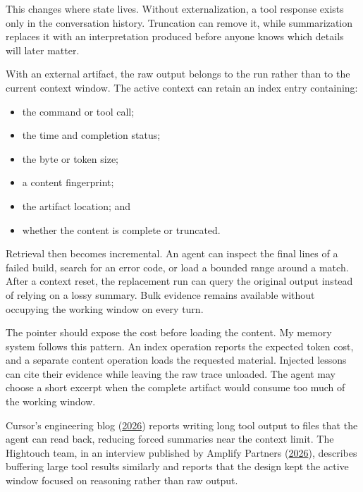 This changes where state lives. Without externalization, a tool response exists only in the conversation history. Truncation can remove it, while summarization replaces it with an interpretation produced before anyone knows which details will later matter.


With an external artifact, the raw output belongs to the run rather than to the current context window. The active context can retain an index entry containing:

\begin{itemize}
\tightlist
\item
  the command or tool call;
\item
  the time and completion status;
\item
  the byte or token size;
\item
  a content fingerprint;
\item
  the artifact location; and
\item
  whether the content is complete or truncated.
\end{itemize}

Retrieval then becomes incremental. An agent can inspect the final lines of a failed build, search for an error code, or load a bounded range around a match. After a context reset, the replacement run can query the original output instead of relying on a lossy summary. Bulk evidence remains available without occupying the working window on every turn.

The pointer should expose the cost before loading the content. My memory system follows this pattern. An index operation reports the expected token cost, and a separate content operation loads the requested material. Injected lessons can cite their evidence while leaving the raw trace unloaded. The agent may choose a short excerpt when the complete artifact would consume too much of the working window.

Cursor's engineering blog (\href{https://cursor.com/blog/dynamic-context-discovery}{2026}) reports writing long tool output to files that the agent can read back, reducing forced summaries near the context limit. The Hightouch team, in an interview published by Amplify Partners (\href{https://www.amplifypartners.com/blog-posts/how-hightouch-built-their-long-running-agent-harness}{2026}), describes buffering large tool results similarly and reports that the design kept the active window focused on reasoning rather than raw output.

